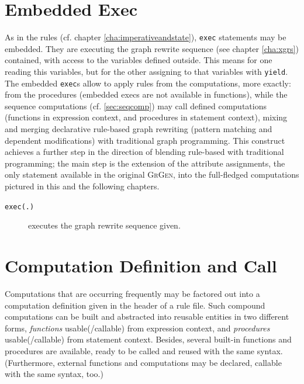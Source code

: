 \section{Embedded Exec} 

As in the rules (cf. chapter \ref{cha:imperativeandstate}), \texttt{exec} statements may be embedded.
They are executing the graph rewrite sequence (see chapter \ref{cha:xgrs}) contained, with access to the variables defined outside.
This means for one reading this variables, but for the other assigning to that variables with \texttt{yield}.
The embedded \texttt{exec}s allow to apply rules from the computations, more exactly: from the procedures (embedded execs are not available in functions), while the sequence computations (cf. \ref{sec:seqcomp}) may call defined computations (functions in expression context, and procedures in statement context), mixing and merging declarative rule-based graph rewriting (pattern matching and dependent modifications) with traditional graph programming.
This construct achieves a further step in the direction of blending rule-based with traditional programming; the main step is the extension of the attribute assignments, the only statement available in the original {\scshape GrGen}, into the full-fledged computations pictured in this and the following chapters.

\begin{description}
\item[\texttt{exec(.)}] executes the graph rewrite sequence given. 
\end{description}



\section{Computation Definition and Call} \label{sub:compdef}

Computations that are occurring frequently may be factored out into a computation definition given in the header of a rule file.
Such compound computations can be built and abstracted into reusable entities in two different forms, \emph{functions} usable(/callable) from expression context, and \emph{procedures} usable(/callable) from statement context.
Besides, several built-in functions and procedures are available, ready to be called and reused with the same syntax.
(Furthermore, external functions and computations may be declared, callable with the same syntax, too.)

